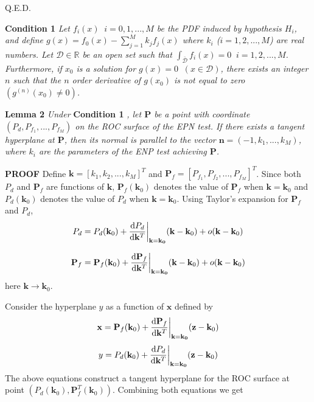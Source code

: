Q.E.D.

\noindent \textbf{Condition 1}
\textit{
\noindent Let $f_i(x) \;\;i=0, 1, ..., M$ be the PDF induced by hypothesis $H_i$, and define $g(x) = f_0(x) - \sum_{j=1}^{M} k_jf_j(x)$ where $k_i$  ($i = 1, 2, ..., M$) are real numbers. Let $\mathcal{D} \in \mathbb{R}$ be an open set such that $\int_{\bar{\mathcal{D}}}f_i(x)=0\;\;i = 1, 2, ..., M$. Furthermore,  if $x_0$ is a solution  for $g(x) = 0 \;\;(x \in \mathcal{D})$, there exists an integer $n$ such that  the $n$ order derivative of $g(x_0)$ is not equal to zero $(g^{(n)}(x_0) \neq 0)$.
}

\noindent \textbf{Lemma 2}
\textit{
\noindent Under}
\textbf{Condition 1}
\textit{, let $\mathbf{P}$ be a point with coordinate $(P_d, P_{f_1}, ..., P_{f_M})$ on the ROC surface of the EPN test. If there exists a tangent hyperplane at $\mathbf{P}$, then its normal is parallel to the vector $\mathbf{n} = (-1, k_1, ..., k_M)$, where $k_i$ are the parameters of the ENP test achieving $\mathbf{P}$.
}

\noindent\textbf{PROOF}
Define $\mathbf{k} = [k_1, k_2, ..., k_M]^T$ and $\mathbf{P}_f = [P_{f_1}, P_{f_2}, ..., P_{f_M}]^T$. Since both $P_d$ and $\mathbf{P}_f$ are functions of $\mathbf{k}$, $\mathbf{P}_f(\mathbf{k}_0)$ denotes the value of $\mathbf{P}_f$ when $\mathbf{k} = \mathbf{k}_0$ and $P_d(\mathbf{k}_0)$ denotes the value of $P_d$ when $\mathbf{k} = \mathbf{k}_0$. Using Taylor's expansion for $\mathbf{P}_f$ and $P_d$,
\begin{equation}
\label{pro: pd}
P_d = P_d(\mathbf{k}_0) + \frac{\mathrm{d}P_d}{\mathrm{d}\mathbf{k}^T}\bigg{|}_{\mathbf{k}=\mathbf{k_0}}(\mathbf{k} - \mathbf{k}_0)
+ o(\mathbf{k} - \mathbf{k}_0)
\end{equation}

\begin{equation}
\label{pro: pf}
\mathbf{P}_f = \mathbf{P}_f(\mathbf{k}_0) + \frac{\mathrm{d}\mathbf{P}_f}{\mathrm{d}\mathbf{k}^T}\bigg{|}_{\mathbf{k}=\mathbf{k_0}}(\mathbf{k} - \mathbf{k}_0)
+ o(\mathbf{k} - \mathbf{k}_0)
\end{equation}
here $\mathbf{k} \rightarrow \mathbf{k}_0$.

Consider the hyperplane $y$ as a function of $\mathbf{x}$ defined by
\begin{equation}
\label{pro: x}
\mathbf{x} = \mathbf{P}_f(\mathbf{k}_0) + \frac{\mathrm{d}\mathbf{P}_f}{\mathrm{d}\mathbf{k}^T}\bigg{|}_{\mathbf{k}=\mathbf{k_0}}(\mathbf{z} - \mathbf{k}_0)
\end{equation}
\begin{equation}
\label{pro: y}
y = P_d(\mathbf{k}_0) + \frac{\mathrm{d}P_d}{\mathrm{d}\mathbf{k}^T}\bigg{|}_{\mathbf{k}=\mathbf{k_0}}(\mathbf{z} - \mathbf{k}_0)
\end{equation}
The above equations construct a tangent hyperplane for the ROC surface at point $(P_d(\mathbf{k}_0), \mathbf{P}_f^T(\mathbf{k}_0))$. Combining both equations  we get

